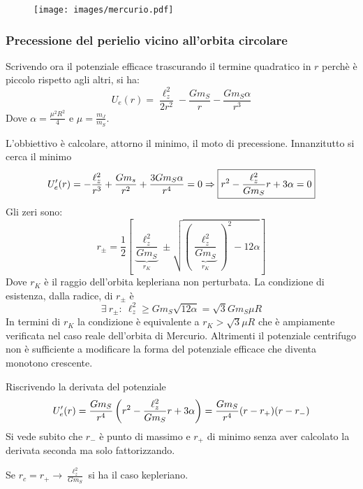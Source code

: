\documentclass[Main.tex]{subfiles}
\begin{document}
\begin{tema}
\begin{figure}[H]
    \centering
    \texttt{[image: images/mercurio.pdf]}
\end{figure}

\subsubsection{Precessione del perielio vicino all'orbita circolare}
Scrivendo ora il potenziale efficace trascurando il termine quadratico in $r$ perchè è piccolo rispetto agli altri, si ha:
\begin{equation}
	U_e(r) = \frac{\ell_z^2}{2r^2} - \frac{Gm_S}{r} - \frac{Gm_S \alpha}{r^3}
\end{equation}
Dove $\alpha= \frac{\mu^2 R^2}{4}$ e $\mu = \frac{m_J}{m_S}$.

L'obbiettivo è calcolare, attorno il minimo, il moto di precessione. Innanzitutto si cerca il minimo
\begin{equation}\notag
	U_e'(r)= - \frac{\ell_z^2}{r^3} + \frac{Gm_s}{r^2} + \frac{3Gm_S \alpha}{r^4}=0\Rightarrow \boxed{r^2 - \frac{\ell_z^2 }{Gm_S}r + 3 \alpha=0}
\end{equation}
Gli zeri sono:
\begin{equation}
	r_\pm = \frac{1}{2} \left[ \underbrace{\frac{\ell_z^2}{Gm_S}}_{r_K} \pm \sqrt{\left( \underbrace{\frac{\ell_z^2}{Gm_S}}_{r_K} \right)^2 -12 \alpha} \right]
\end{equation}
Dove $r_K$ è il raggio dell'orbita kepleriana non perturbata. La condizione di esistenza, dalla radice, di $r_\pm$ è 
\begin{equation}
	\exists \ r_\pm : \ \ell_z^2 \geq Gm_S \sqrt{12 \alpha} = \sqrt{3}Gm_S \mu R
\end{equation} 
In termini di $r_K$ la condizione è equivalente a $r_K > \sqrt{3} \mu R$ che è ampiamente verificata nel caso reale dell'orbita di Mercurio. Altrimenti il potenziale centrifugo non è sufficiente a modificare la forma del potenziale efficace che diventa monotono crescente.


Riscrivendo la derivata del potenziale 
\begin{equation}\notag
U_e'(r)=\frac{Gm_S}{r^4} \left( r^2 - \frac{\ell_z^2}{Gm_S}r + 3 \alpha \right) = \frac{Gm_S}{r^4} (r-r_+)(r-r_-)
\end{equation}
Si vede subito che $r_-$ è punto di massimo e $r_+$ di minimo senza aver calcolato la derivata seconda ma solo fattorizzando.
\begin{osservazione}
	Se $r_c=r_+ \rightarrow \frac{\ell_z^2}{Gm_S}$ si ha il caso kepleriano.
\end{osservazione}


\end{tema}
\end{document}
